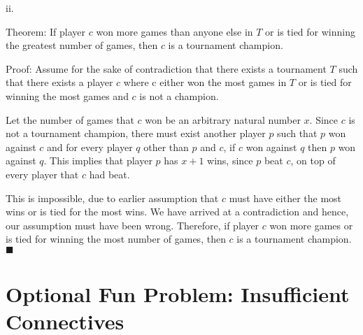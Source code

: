 \documentclass{article}
\renewcommand{\(}{\left(}
\renewcommand{\)}{\right)}
\theoremstyle{plain}
\theoremstyle{plain}
\theoremstyle{definition}
\begin{document}
    ii.
    \begin{shaded}
                Theorem: If player $c$ won more games than anyone else in $T$ or is tied for winning the greatest number of games, then $c$ is a tournament champion.
                
                \vspace{4mm}

                Proof: Assume for the sake of contradiction that there exists a tournament $T$ such that there exists a player $c$ where c either won the most games in $T$ or is tied for winning the most games and $c$ is not a champion.

                \vspace{4mm}

                Let the number of games that $c$ won be an arbitrary natural number $x$. 
                Since $c$ is not a tournament champion, there must exist another player $p$ such that $p$ won against $c$ and for every player $q$ other than $p$ and $c$, if $c$ won against $q$ then $p$ won against $q$. This implies that player $p$ has $x+1$ wins, since $p$ beat $c$, on top of every player that $c$ had beat.
                
                \vspace{4mm}

                This is impossible, due to earlier assumption that $c$ must have either the most wins or is tied for the most wins. We have arrived at a contradiction and hence, our assumption must have been wrong. Therefore, if player $c$ won more games or is tied for winning the most number of games, then $c$ is a tournament champion. $\blacksquare$
    \end{shaded}
    
\newpage

\section*{Optional Fun Problem: Insufficient Connectives}
\end{document}
